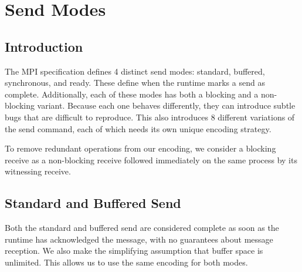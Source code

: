 \section{Send Modes}

\subsection{Introduction}
The MPI specification defines 4 distinct send modes: standard, buffered,
synchronous, and ready. These define when the runtime marks a send as complete.
Additionally, each of these modes has both a blocking and a non-blocking
variant.
Because each one behaves differently, they can introduce subtle bugs that
are difficult to reproduce. 
This also introduces 8 different variations of the send command, each of which
needs its own unique encoding strategy.

To remove redundant operations from our encoding, we consider a blocking receive
as a non-blocking receive followed immediately on the same process by its
witnessing receive.

\subsection{Standard and Buffered Send}
Both the standard and buffered send are considered complete as soon as the
runtime has acknowledged the message, with no guarantees about message
reception. We also make the simplifying assumption that buffer space is
unlimited. This allows us to use the same encoding for both modes.

